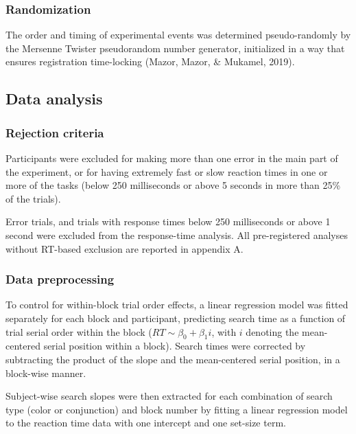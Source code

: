 \documentclass[
  english,
  man]{apa6}
\begin{document}
\hypertarget{randomization}{%
\subsubsection{Randomization}\label{randomization}}

The order and timing of experimental events was determined pseudo-randomly by the Mersenne Twister pseudorandom number generator, initialized in a way that ensures registration time-locking (Mazor, Mazor, \& Mukamel, 2019).

\hypertarget{data-analysis}{%
\subsection{Data analysis}\label{data-analysis}}

\hypertarget{rejection-criteria}{%
\subsubsection{Rejection criteria}\label{rejection-criteria}}

Participants were excluded for making more than one error in the main part of the experiment, or for having extremely fast or slow reaction times in one or more of the tasks (below 250 milliseconds or above 5 seconds in more than 25\% of the trials).

Error trials, and trials with response times below 250 milliseconds or above 1 second were excluded from the response-time analysis. All pre-registered analyses without RT-based exclusion are reported in appendix A.

\hypertarget{data-preprocessing}{%
\subsubsection{Data preprocessing}\label{data-preprocessing}}

To control for within-block trial order effects, a linear regression model was fitted separately for each block and participant, predicting search time as a function of trial serial order within the block (\(RT \sim \beta_0+\beta_1i\), with \(i\) denoting the mean-centered serial position within a block). Search times were corrected by subtracting the product of the slope and the mean-centered serial position, in a block-wise manner.

Subject-wise search slopes were then extracted for each combination of search type (color or conjunction) and block number by fitting a linear regression model to the reaction time data with one intercept and one set-size term.
\end{document}
